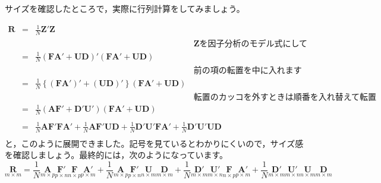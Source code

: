 サイズを確認したところで，実際に行列計算をしてみましょう。

\begin{equation}
	\begin{array}{lll}
		\bm{R} & = & \frac{1}{N} \bm{Z}'\bm{Z}                                                                                                                                                      \\
		       &   & \hspace{8cm}\text{$\bm{Z}$を因子分析のモデル式にして}                                                                                                                                       \\
		       & = & \frac{1}{N}(\bm{F} \bm{A} ' + \bm{U} \bm{D})'(\bm{F} \bm{A} ' + \bm{U} \bm{D})                                                                                                 \\
		       &   & \hspace{8cm}\text{前の項の転置を中に入れます}                                                                                                                                               \\
		       & = & \frac{1}{N}\left \{ (\bm{F} \bm{A} ')'+(\bm{U} \bm{D})' \right \}(\bm{F} \bm{A} ' + \bm{U} \bm{D})                                                                             \\
		       &   & \hspace{8cm}\text{転置のカッコを外すときは順番を入れ替えて転置}                                                                                                                                      \\
		       & = & \frac{1}{N}(\bm{A} \bm{F} ' + \bm{D}' \bm{U} ')(\bm{F} \bm{A} ' + \bm{U} \bm{D})                                                                                               \\
		       &   & \hspace{8cm}                                                                                                                                                                   \\
		       & = & \frac{1}{N}\bm{A} \bm{F}' \bm{F} \bm{A}' + \frac{1}{N} \bm{A} \bm{F}' \bm{U} \bm{D} + \frac{1}{N} \bm{D}' \bm{U} ' \bm{F} \bm{A} ' + \frac{1}{N} \bm{D}' \bm{U}' \bm{U} \bm{D} \\
	\end{array}
\end{equation}
と，このように展開できました。記号を見ているとわかりにくいので，サイズ感を確認しましょう。最終的には，次のようになっています。
\[
	\underset{m \times m}{\bm{R}} =
	\frac{1}{N} \underset{m \times p}{\bm{A}} \underset{p \times n}{\bm{F}'} \underset{n \times p}{\bm{F}} \underset{p \times m}{\bm{A}'} +
	\frac{1}{N} \underset{m \times p}{\bm{A}} \underset{p \times n}{\bm{F}'} \underset{n \times m}{\bm{U}} \underset{m \times m}{\bm{D}} +
	\frac{1}{N} \underset{m \times m}{\bm{D}'} \underset{m \times n}{\bm{U}'} \underset{n \times p}{\bm{F}} \underset{p \times m}{\bm{A}'} +
	\frac{1}{N} \underset{m \times m}{\bm{D}'} \underset{m \times n}{\bm{U}'} \underset{n \times m}{\bm{U}} \underset{m \times m}{\bm{D}}
\]

